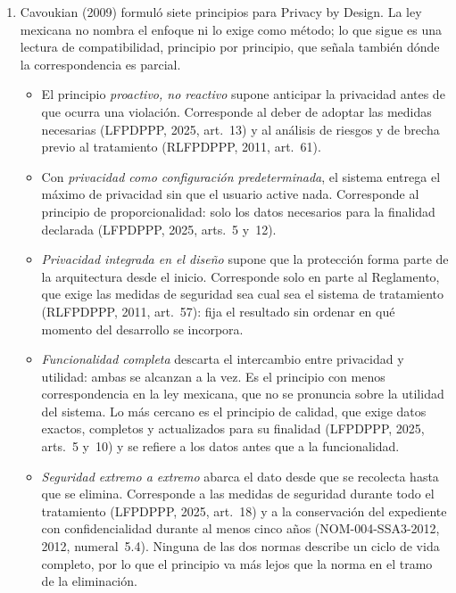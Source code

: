 \documentclass[12pt, a4paper]{article}
\begin{document}
\begin{enumerate}[label=\Roman*.]
 
  \item Cavoukian (2009) formuló siete principios para Privacy by
  Design. La ley mexicana no nombra el enfoque ni lo exige como
  método; lo que sigue es una lectura de compatibilidad, principio
  por principio, que señala también dónde la correspondencia es
  parcial.
 
  \begin{itemize}
    \item El principio \textit{proactivo, no reactivo} supone
    anticipar la privacidad antes de que ocurra una violación.
    Corresponde al deber de adoptar las medidas necesarias
    (LFPDPPP, 2025, art.~13) y al análisis de riesgos y de brecha
    previo al tratamiento (RLFPDPPP, 2011, art.~61).
 
    \item Con \textit{privacidad como configuración
    predeterminada}, el sistema entrega el máximo de privacidad
    sin que el usuario active nada. Corresponde al principio de
    proporcionalidad: solo los datos necesarios para la finalidad
    declarada (LFPDPPP, 2025, arts.~5 y~12).
 
    \item \textit{Privacidad integrada en el diseño} supone que la
    protección forma parte de la arquitectura desde el inicio.
    Corresponde solo en parte al Reglamento, que exige las medidas
    de seguridad sea cual sea el sistema de tratamiento (RLFPDPPP,
    2011, art.~57): fija el resultado sin ordenar en qué momento
    del desarrollo se incorpora.
 
    \item \textit{Funcionalidad completa} descarta el intercambio
    entre privacidad y utilidad: ambas se alcanzan a la vez. Es el
    principio con menos correspondencia en la ley mexicana, que no
   se pronuncia sobre la utilidad del sistema. Lo más cercano es
    el principio de calidad, que exige datos exactos, completos y
    actualizados para su finalidad (LFPDPPP, 2025, arts.~5 y~10) y se
    refiere a los datos antes que a la funcionalidad.
 
    \item \textit{Seguridad extremo a extremo} abarca el dato desde
    que se recolecta hasta que se elimina. Corresponde a las
    medidas de seguridad durante todo el tratamiento (LFPDPPP,
    2025, art.~18) y a la conservación del expediente con
    confidencialidad durante al menos cinco años
    (NOM-004-SSA3-2012, 2012, numeral~5.4). Ninguna de las dos
    normas describe un ciclo de vida completo, por lo que el
    principio va más lejos que la norma en el tramo de la
    eliminación.
 

\end{itemize}
\end{enumerate}
\end{document}
